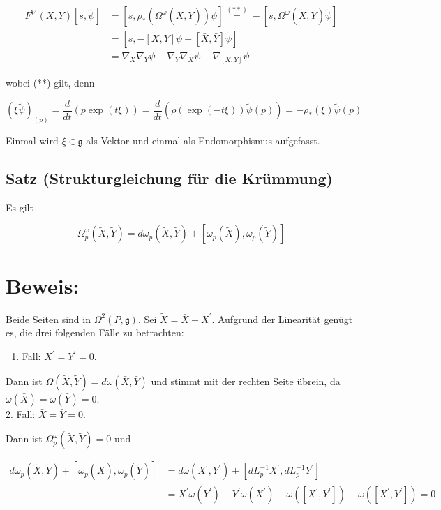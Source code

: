 \documentclass[10pt, letterpaper]{article}
\begin{document}
$$
\begin{aligned}
F^{\nabla}(X, Y)[s, \tilde{\psi}] & =\left[s, \rho_{*}\left(\Omega^{\omega}(\tilde{X}, \tilde{Y})\right) \psi\right] \stackrel{(* *)}{=}-\left[s, \Omega^{\omega}(\tilde{X}, \tilde{Y}) \tilde{\psi}\right] \\
& =[s,-\overline{[X, Y]} \tilde{\psi}+[\bar{X}, \bar{Y}] \tilde{\psi}] \\
& =\nabla_{X} \nabla_{Y} \psi-\nabla_{Y} \nabla_{X} \psi-\nabla_{[X, Y]} \psi
\end{aligned}
$$

wobei (**) gilt, denn

$$
(\xi \tilde{\psi})_{(p)}=\frac{d}{d t}(p \exp (t \xi))=\frac{d}{d t}(\rho(\exp (-t \xi)) \tilde{\psi}(p))=-\rho_{*}(\xi) \tilde{\psi}(p)
$$

Einmal wird $\xi \in \mathfrak{g}$ als Vektor und einmal als Endomorphismus aufgefasst.

\subsection*{Satz (Strukturgleichung für die Krümmung)}
Es gilt

$$
\Omega_{p}^{\omega}(\tilde{X}, \tilde{Y})=d \omega_{p}(\tilde{X}, \tilde{Y})+\left[\omega_{p}(\tilde{X}), \omega_{p}(\tilde{Y})\right]
$$

\section*{Beweis:}
Beide Seiten sind in $\Omega^{2}(P, \mathfrak{g})$. Sei $\tilde{X}=\bar{X}+X^{\prime}$. Aufgrund der Linearität genügt es, die drei folgenden Fälle zu betrachten:

\begin{enumerate}
  \item Fall: $X^{\prime}=Y^{\prime}=0$.
\end{enumerate}

Dann ist $\Omega(\tilde{X}, \tilde{Y})=d \omega(\bar{X}, \bar{Y})$ und stimmt mit der rechten Seite übrein, da $\omega(\bar{X})=\omega(\bar{Y})=0$.\\
2. Fall: $\bar{X}=\bar{Y}=0$.

Dann ist $\Omega_{p}^{\omega}(\tilde{X}, \tilde{Y})=0$ und

$$
\begin{aligned}
d \omega_{p}(\tilde{X}, \tilde{Y})+\left[\omega_{p}(\tilde{X}), \omega_{p}(\tilde{Y})\right] & =d \omega\left(X^{\prime}, Y^{\prime}\right)+\left[d L_{p}^{-1} X^{\prime}, d L_{p}^{-1} Y^{\prime}\right] \\
& =X^{\prime} \omega\left(Y^{\prime}\right)-Y^{\prime} \omega\left(X^{\prime}\right)-\omega\left(\left[X^{\prime}, Y^{\prime}\right]\right)+\omega\left(\left[X^{\prime}, Y^{\prime}\right]\right)=0
\end{aligned}
$$
\end{document}
